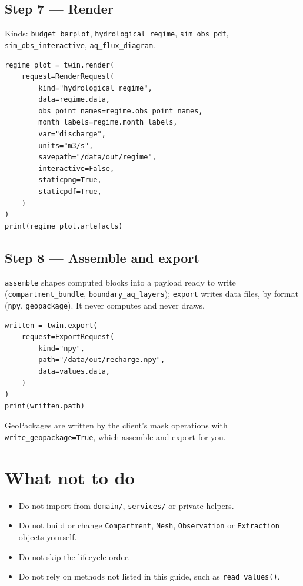 \documentclass[11pt]{article}
\begin{document}
\subsection{Step 7 --- Render}

Kinds: \texttt{budget\_barplot}, \texttt{hydrological\_regime},
\texttt{sim\_obs\_pdf}, \texttt{sim\_obs\_interactive}, \texttt{aq\_flux\_diagram}.

\begin{verbatim}
regime_plot = twin.render(
    request=RenderRequest(
        kind="hydrological_regime",
        data=regime.data,
        obs_point_names=regime.obs_point_names,
        month_labels=regime.month_labels,
        var="discharge",
        units="m3/s",
        savepath="/data/out/regime",
        interactive=False,
        staticpng=True,
        staticpdf=True,
    )
)
print(regime_plot.artefacts)
\end{verbatim}

\subsection{Step 8 --- Assemble and export}

\texttt{assemble} shapes computed blocks into a payload ready to write
(\texttt{compartment\_bundle}, \texttt{boundary\_aq\_layers}); \texttt{export}
writes data files, by format (\texttt{npy}, \texttt{geopackage}). It never
computes and never draws.

\begin{verbatim}
written = twin.export(
    request=ExportRequest(
        kind="npy",
        path="/data/out/recharge.npy",
        data=values.data,
    )
)
print(written.path)
\end{verbatim}

GeoPackages are written by the client's mask operations with
\texttt{write\_geopackage=True}, which assemble and export for you.

\section{What not to do}

\begin{itemize}
    \item Do not import from \texttt{domain/}, \texttt{services/} or private helpers.
    \item Do not build or change \texttt{Compartment}, \texttt{Mesh}, \texttt{Observation} or \texttt{Extraction} objects yourself.
    \item Do not skip the lifecycle order.
    \item Do not rely on methods not listed in this guide, such as \texttt{read\_values()}.
\end{itemize}
\end{document}
